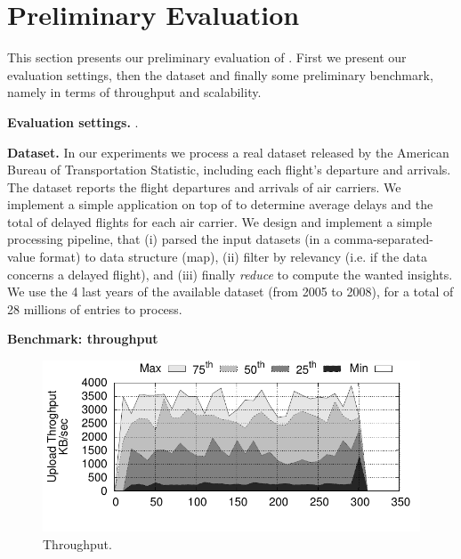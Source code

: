 \section{Preliminary Evaluation}
\label{sec:eval}

This section presents our preliminary evaluation of \SYS.
First we present our evaluation settings, then the dataset and finally some preliminary benchmark, namely in terms of throughput and scalability.

\textbf{Evaluation settings.} 
.

\textbf{Dataset.} In our experiments we process a real dataset released by the American Bureau of Transportation Statistic\cite{rita:bts}, including each flight's departure and arrivals\cite{statistical_computing:data}.
The dataset reports the flight departures and arrivals of  air carriers.
We implement a simple application on top of \SYS to determine average delays and the total of delayed flights for each air carrier.
We design and implement a simple processing pipeline, that (i) parsed the input datasets (in a comma-separated-value format) to data structure (map), (ii) filter by relevancy (i.e. if the data concerns a delayed flight), and (iii) finally \emph{reduce} to compute the wanted insights.
We use the 4 last years of the available dataset (from 2005 to 2008), for a total of 28 millions of entries to process.


\textbf{Benchmark: throughput}

\begin{figure}[t!]
  \centering
  \includegraphics[width=.99\linewidth]{images/tput_upload}
  \caption{Throughput.}
  \label{fig:throughput}
\end{figure}

